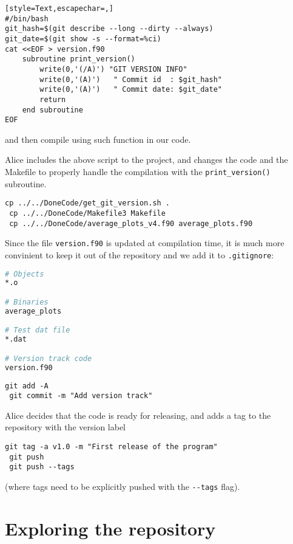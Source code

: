 \documentclass[a4paper,10pt]{article}
\begin{document}
\begin{lstlisting}[style=Text,escapechar=,]
#/bin/bash
git_hash=$(git describe --long --dirty --always)
git_date=$(git show -s --format=%ci)
cat <<EOF > version.f90
    subroutine print_version()
        write(0,'(/A)') "GIT VERSION INFO"
        write(0,'(A)')   " Commit id  : $git_hash"
        write(0,'(A)')   " Commit date: $git_date"
        return
    end subroutine 
EOF
\end{lstlisting}
and then compile using such function in our code.

Alice includes the above script to the project, and changes the code and the Makefile to properly handle the compilation with the \texttt{print\_version()} subroutine.

\begin{lstlisting}[style=AliceFake]
 cp ../../DoneCode/get_git_version.sh .
 cp ../../DoneCode/Makefile3 Makefile
 cp ../../DoneCode/average_plots_v4.f90 average_plots.f90
\end{lstlisting}

Since the file \texttt{version.f90} is updated at compilation time, it is much more convinient to keep it out of the repository and we add it to \texttt{.gitignore}:

\begin{lstlisting}[style=Text,language=bash,commentstyle=\color{blue}]
# Objects
*.o

# Binaries
average_plots

# Test dat file
*.dat

# Version track code
version.f90
\end{lstlisting}

\begin{lstlisting}[style=Alice]
 git add -A
 git commit -m "Add version track"
\end{lstlisting}

Alice decides that the code is ready for releasing, and adds a tag to the repository with the version label

\begin{lstlisting}[style=Alice]
 git tag -a v1.0 -m "First release of the program"
 git push 
 git push --tags
\end{lstlisting}
(where tags need to be explicitly pushed with the \texttt{-{}-tags} flag).

\clearpage

\section{Exploring the repository}
\end{document}
